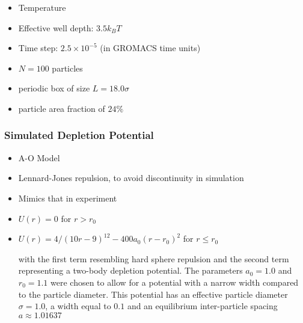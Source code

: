 \documentclass[11pt]{article}
\begin{document}
\begin{itemize}
\item Temperature\\
\label{sec-2.3.3.4}


\item Effective well depth: $3.5 k_B T$\\
\label{sec-2.3.3.5}


\item Time step: $2.5 \times 10^{-5}$ (in GROMACS time units)\\
\label{sec-2.3.3.6}


\item $N=100$ particles\\
\label{sec-2.3.3.7}


\item periodic box of size $L = 18.0 \sigma$\\
\label{sec-2.3.3.8}


\item particle area fraction of $24\%$\\
\label{sec-2.3.3.9}


\end{itemize} %
\subsubsection{Simulated Depletion Potential}
\label{sec-2.3.4}

\begin{itemize}

\item A-O Model\\
\label{sec-2.3.4.1}


\item Lennard-Jones repulsion, to avoid discontinuity in simulation\\
\label{sec-2.3.4.2}


\item Mimics that in experiment\\
\label{sec-2.3.4.3}


\item $U(r)=0$ for $r > r_0$\\
\label{sec-2.3.4.4}


\item $U(r)=4/(10r-9)^{12} -  400 a_0 (r-r_0)^2$ for $r \le r_0$\\
\label{sec-2.3.4.5}

with the first term resembling hard sphere repulsion and the second term  representing a two-body depletion potential. The parameters $a_0=1.0$ and $r_0=1.1$ were chosen to allow for  a potential with a narrow width compared to the particle diameter. This potential has an effective particle diameter $\sigma=1.0$,  a width equal to $0.1$ and an equilibrium inter-particle spacing $a \approx 1.01637$

\end{itemize} %
\end{document}

